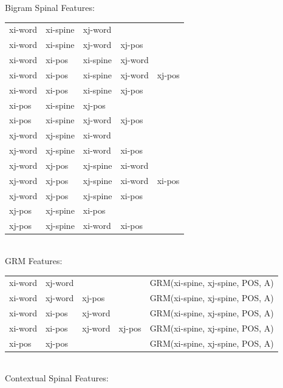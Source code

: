 \documentclass[11pt]{article}
\begin{document}
Bigram Spinal Features:  \\

\begin{tabular}{|l l l l l| }
	\hline
		xi-word& xi-spine& xj-word&&\\
		xi-word& xi-spine& xj-word & xj-pos& \\
		xi-word& xi-pos& xi-spine& xj-word &\\
        xi-word& xi-pos& xi-spine& xj-word & xj-pos\\
        xi-word& xi-pos& xi-spine& xj-pos &\\
        xi-pos&xi-spine&xj-pos&&\\
        xi-pos&xi-spine&xj-word&xj-pos&\\
		xj-word& xj-spine& xi-word&&\\
		xj-word& xj-spine& xi-word & xi-pos& \\
		xj-word& xj-pos& xj-spine& xi-word &\\
        xj-word& xj-pos& xj-spine& xi-word & xi-pos\\
        xj-word& xj-pos& xj-spine& xi-pos &\\
        xj-pos&xj-spine&xi-pos&&\\
        xj-pos&xj-spine&xi-word&xi-pos&\\
	\hline
\end{tabular} \\

GRM Features:  \\

\begin{tabular}{|l l l l l| }
	\hline
		xi-word&xj-word&&&GRM(xi-spine, xj-spine, POS, A)\\
		xi-word&xj-word & xj-pos&&GRM(xi-spine, xj-spine, POS, A) \\
		xi-word&xi-pos&xj-word &&GRM(xi-spine, xj-spine, POS, A)\\
        xi-word& xi-pos&xj-word & xj-pos& GRM(xi-spine, xj-spine, POS, A)\\
		xi-pos&xj-pos&&&GRM(xi-spine, xj-spine, POS, A)\\
	\hline
\end{tabular} \\

\vspace{10cm}
Contextual Spinal Features: \\
\end{document}
